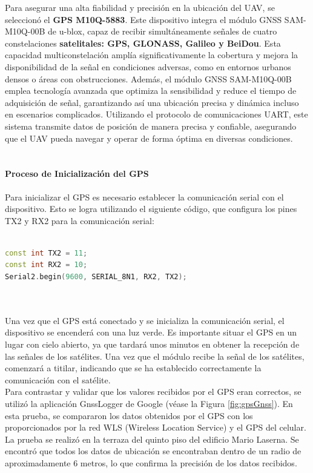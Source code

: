 Para asegurar una alta fiabilidad y precisión en la ubicación del UAV, se seleccionó el \textbf{GPS M10Q-5883}. Este dispositivo integra el módulo GNSS SAM-M10Q-00B de u-blox, capaz de recibir simultáneamente señales de cuatro constelaciones \textbf{satelitales: GPS, GLONASS, Galileo y BeiDou}.\cite{GPS} Esta capacidad multiconstelación amplía significativamente la cobertura y mejora la disponibilidad de la señal en condiciones adversas, como en entornos urbanos densos o áreas con obstrucciones. Además, el módulo GNSS SAM-M10Q-00B emplea tecnología avanzada que optimiza la sensibilidad y reduce el tiempo de adquisición de señal, garantizando así una ubicación precisa y dinámica incluso en escenarios complicados. Utilizando el protocolo de comunicaciones UART, este sistema transmite datos de posición de manera precisa y confiable, asegurando que el UAV pueda navegar y operar de forma óptima en diversas condiciones. \\ \\

\paragraph{\large  \textbf{Proceso de Inicialización del GPS}}
Para inicializar el GPS es necesario establecer la comunicación serial con el dispositivo. Esto se logra utilizando el siguiente código, que configura los pines TX2 y RX2 para la comunicación serial: \\ \\
\begin{lstlisting}[language=C++]
const int TX2 = 11;
const int RX2 = 10;
Serial2.begin(9600, SERIAL_8N1, RX2, TX2);
\end{lstlisting}

\\ \\

Una vez que el GPS está conectado y se inicializa la comunicación serial, el dispositivo se encenderá con una luz verde. Es importante situar el GPS en un lugar con cielo abierto, ya que tardará unos minutos en obtener la recepción de las señales de los satélites. Una vez que el módulo recibe la señal de los satélites, comenzará a titilar, indicando que se ha establecido correctamente la comunicación con el satélite. \\

Para contrastar y validar que los valores recibidos por el GPS eran correctos, se utilizó la aplicación GnssLogger de Google (véase la Figura \ref{fig:gpsGnss}). En esta prueba, se compararon los datos obtenidos por el GPS con los proporcionados por la red WLS (Wireless Location Service) y el GPS del celular. La prueba se realizó en la terraza del quinto piso del edificio Mario Laserna. Se encontró que todos los datos de ubicación se encontraban dentro de un radio de aproximadamente 6 metros, lo que confirma la precisión de los datos recibidos. \\ 


